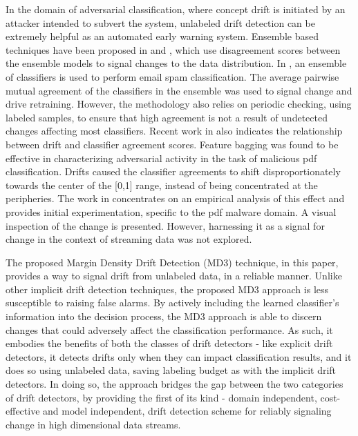 \documentclass[authoryear,3p,times,twocolumn]{elsarticle}
\begin{document}
In the domain of adversarial classification, where concept drift is initiated by an attacker intended to subvert the system, unlabeled drift detection can be extremely helpful as an automated early warning system. Ensemble based techniques have been proposed in \citep{chinavle2009ensembles} and  \citep{kuncheva2008classifier}, which use disagreement scores between the ensemble models to signal changes to the data distribution. In \citep{chinavle2009ensembles}, an ensemble of classifiers is used to perform email spam classification. The average pairwise mutual agreement of the classifiers in the ensemble was used to signal change and drive retraining. However, the methodology also relies on periodic checking, using labeled samples, to ensure that high agreement is not a result of undetected changes affecting most classifiers. Recent work in \citep{smutz2016tree} also indicates the relationship between drift and classifier agreement scores. Feature bagging was found to be effective in characterizing adversarial activity in the task of malicious pdf classification. Drifts caused the classifier agreements to shift disproportionately towards the center of the [0,1] range, instead of being concentrated at the peripheries. The work in \citep{smutz2016tree} concentrates on an empirical analysis of this effect and provides initial experimentation, specific to the pdf malware domain. A  visual inspection of the change is presented. However, harnessing it as a signal for change in the context of streaming data was not explored. 

The proposed Margin Density Drift Detection (MD3) technique, in this paper, provides a way to signal drift from unlabeled data, in a reliable manner. Unlike other implicit drift detection techniques, the proposed MD3 approach is less susceptible to raising false alarms. By actively including the learned classifier's information into the decision process, the MD3 approach is able to discern changes that could adversely affect the classification performance. As such, it embodies the benefits of both the classes of drift detectors - like explicit drift detectors, it detects drifts only when they can impact classification results, and it does so using unlabeled data, saving labeling budget as with the implicit drift detectors.  In doing so, the approach bridges the gap between the two categories of drift detectors, by providing the first of its kind - domain independent, cost-effective and model independent, drift detection scheme for reliably signaling change in high dimensional data streams. 
\end{document}
